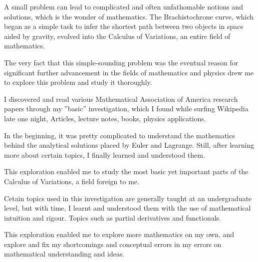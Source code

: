 

{A small problem can lead to complicated and often unfathomable notions and solutions, which is the wonder of mathematics. The Brachistochrone curve, which began as a simple task to infer the shortest path between two objects in space aided by gravity, evolved into the Calculus of Variations, an entire field of mathematics.}

{The very fact that this simple-sounding problem was the eventual reason for significant further advancement in the fields of mathematics and physics drew me to explore this problem and study it thoroughly.}

{I discovered and read various Mathematical Association of America research papers through my ”basic” investigation, which I found while surfing Wikipedia late one night, Articles, lecture notes, books, physics applications.}

{In the beginning, it was pretty complicated to understand the mathematics behind the analytical solutions placed by Euler and Lagrange. Still, after learning more about certain topics, I finally learned and understood them.}

{This exploration enabled me to study the most basic yet important parts of the Calculus of Variations, a field foreign to me.}

{Cetain topics used in this investigation are generally taught at an undergraduate level, but with time, I learnt and understood them with the use of mathematical intuition and rigour. Topics such as partial derivatives and functionals.}

{This exploration enabled me to explore more mathematics on my own, and explore and fix my shortcomings and conceptual errors in my errors on mathematical understanding and ideas.}

{}

